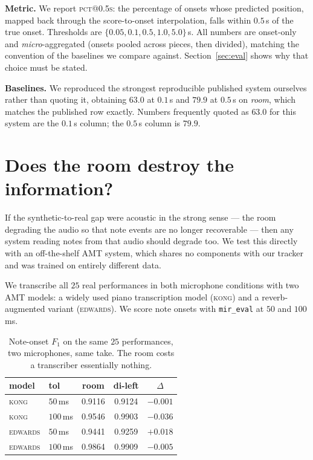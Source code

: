 \documentclass{article}
\begin{document}
\noindent\textbf{Metric.} We report \textsc{pct@0.5s}: the percentage of onsets
whose predicted position, mapped back through the score-to-onset interpolation,
falls within $0.5\,$s of the true onset. Thresholds are
$\{0.05, 0.1, 0.5, 1.0, 5.0\}\,$s. All numbers are onset-only and
\emph{micro}-aggregated (onsets pooled across pieces, then divided), matching
the convention of the baselines we compare against. Section~\ref{sec:eval}
shows why that choice must be stated.

\noindent\textbf{Baselines.} We reproduced the strongest reproducible published
system ourselves rather than quoting it, obtaining
$63.0$ at $0.1\,$s and $79.9$ at $0.5\,$s on \emph{room}, which matches the
published row exactly. Numbers frequently quoted as $63.0$ for this system are
the $0.1\,$s column; the $0.5\,$s column is $79.9$.

\section{Does the room destroy the information?}
\label{sec:twomic}

If the synthetic-to-real gap were acoustic in the strong sense --- the room
degrading the audio so that note events are no longer recoverable --- then any
system reading notes from that audio should degrade too. We test this directly
with an off-the-shelf AMT system, which shares no components with our tracker
and was trained on entirely different data.

We transcribe all $25$ real performances in both microphone conditions with two
AMT models: a widely used piano transcription model (\textsc{kong}) and a
reverb-augmented variant (\textsc{edwards}). We score note onsets with
\texttt{mir\_eval} at $50$ and $100\,$ms.

\begin{table}[t]
\centering
\caption{Note-onset $F_1$ on the same $25$ performances, two microphones,
         same take. The room costs a transcriber essentially nothing.}
\label{tab:twomic}
\begin{tabular}{llccc}
\toprule
model & tol & room & di-left & $\Delta$ \\
\midrule
\textsc{kong}     & $50\,$ms  & 0.9116 & 0.9124 & $-0.001$ \\
\textsc{kong}     & $100\,$ms & 0.9546 & 0.9903 & $-0.036$ \\
\textsc{edwards}  & $50\,$ms  & 0.9441 & 0.9259 & $+0.018$ \\
\textsc{edwards}  & $100\,$ms & 0.9864 & 0.9909 & $-0.005$ \\
\bottomrule
\end{tabular}
\end{table}
\end{document}

